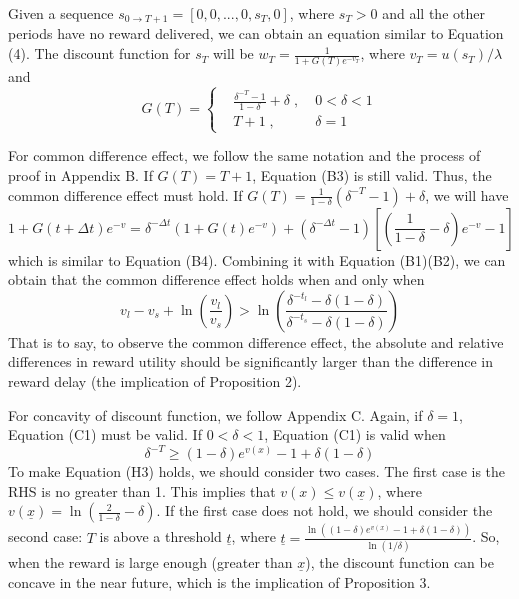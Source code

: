 \documentclass[
  12pt,
]{article}
\begin{document}
Given a sequence \(s_{0\rightarrow T+1}=[0,0,...,0,s_T,0]\), where
\(s_T>0\) and all the other periods have no reward delivered, we can
obtain an equation similar to Equation (4). The discount function for
\(s_T\) will be \(w_T=\frac{1}{1+G(T)e^{-v_T}}\), where
\(v_T=u(s_T)/\lambda\) and \[\tag{H1}
G(T)=\left\{
\begin{aligned}
& \frac{\delta^{-T}-1}{1-\delta}+\delta \;,&\; 0<\delta<1 \\
& T+1 \;,&\; \delta=1
\end{aligned}
\right.
\]

For common difference effect, we follow the same notation and the
process of proof in Appendix B. If \(G(T)=T+1\), Equation (B3) is still
valid. Thus, the common difference effect must hold. If
\(G(T)=\frac{1}{1-\delta}(\delta^{-T}-1)+\delta\), we will
have\[\tag{H2}
1+G(t+\Delta t)e^{-v}=
\delta^{-\Delta t}(1+G(t)e^{-v})+(\delta^{-\Delta t}-1)[(\frac{1}{1-\delta}-\delta)e^{-v}-1]
\]which is similar to Equation (B4). Combining it with Equation
(B1)(B2), we can obtain that the common difference effect holds when and
only when\[
v_l-v_s+\ln\left(\frac{v_l}{v_s}\right)>
\ln\left(\frac{\delta^{-t_l}-\delta(1-\delta)}{\delta^{-t_s}-\delta(1-\delta)}\right)
\]That is to say, to observe the common difference effect, the absolute
and relative differences in reward utility should be significantly
larger than the difference in reward delay (the implication of
Proposition 2).

For concavity of discount function, we follow Appendix C. Again, if
\(\delta=1\), Equation (C1) must be valid. If \(0<\delta<1\), Equation
(C1) is valid when\[\tag{H3}
\delta^{-T}\geq (1-\delta)e^{v(x)}-1+\delta(1-\delta)
\]To make Equation (H3) holds, we should consider two cases. The first
case is the RHS is no greater than 1. This implies that
\(v(x)\leq v(\underline{x})\), where
\(v(\underline{x})=\ln(\frac{2}{1-\delta}-\delta)\). If the first case
does not hold, we should consider the second case: \(T\) is above a
threshold \(\underline{t}\), where
\(\underline{t}=\frac{\ln((1-\delta)e^{v(x)}-1+\delta(1-\delta))}{\ln(1/\delta)}\).
So, when the reward is large enough (greater than \(\underline{x}\)),
the discount function can be concave in the near future, which is the
implication of Proposition 3.
\end{document}
